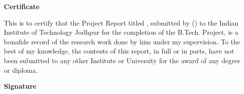 \begin{flushright}
\huge{\textbf{Certificate}}
\end{flushright}
This is to certify that the Project Report titled \ttitle{}, submitted by \authorname{} (\rn{}) to the Indian Institute of Technology Jodhpur for the completion of the B.Tech. Project, is a bonafide record of the research work done by him under my supervision. To the best of my knowledge, the contents of this report, in full or in parts, have not been submitted to any other Institute or University for the award of any degree or diploma.
\vspace{2cm}
\begin{flushright}
\large{\textbf{Signature}}\\
\supname\\
\end{flushright}